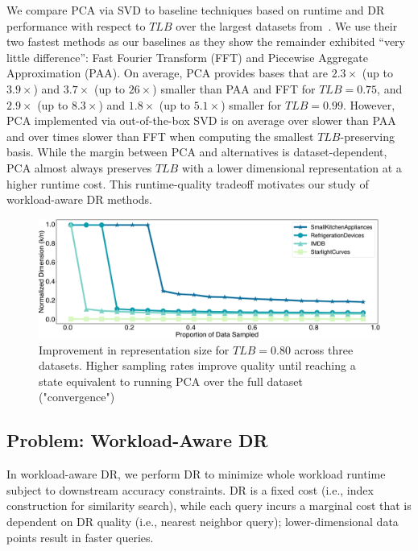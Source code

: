 We compare PCA via SVD to baseline techniques based on runtime and DR performance with respect to $TLB$ over the largest datasets from~\cite{keogh-study}. 
We use their two fastest methods as our baselines as they show the remainder exhibited ``very little difference'': Fast Fourier Transform (FFT) and Piecewise Aggregate Approximation (PAA).
On average, PCA provides bases that are $2.3\times$ (up to $3.9\times$) and $3.7\times$ (up to $26\times$)  smaller than PAA and FFT for $TLB = 0.75$, and $2.9\times$ (up to $8.3\times$) and $1.8\times$ (up to $5.1\times$) smaller for $TLB = 0.99$.
However, PCA implemented via out-of-the-box SVD is on average over  slower than PAA and over  times slower than FFT when computing the smallest $TLB$-preserving basis.
While the margin between PCA and alternatives is dataset-dependent, PCA almost always preserves $TLB$ with a lower dimensional representation at a higher runtime cost.
This runtime-quality tradeoff motivates our study of workload-aware DR methods. 

\begin{figure}
\includegraphics[width=\linewidth]{figs/progressive.pdf}
\caption[]{ Improvement in representation size for  $TLB = 0.80$ across three datasets. Higher sampling rates improve quality until reaching a state equivalent to running PCA over the full dataset ("convergence")}
\label{fig:progressive}
\end{figure}


\subsection{Problem: Workload-Aware DR}
\label{subsec:wadr}

In workload-aware DR, we perform DR to minimize whole workload runtime subject to downstream accuracy constraints.
DR is a fixed cost (i.e., index construction for similarity search), while each query incurs a marginal cost that is dependent on DR quality (i.e., nearest neighbor query); lower-dimensional data points result in faster queries. 

